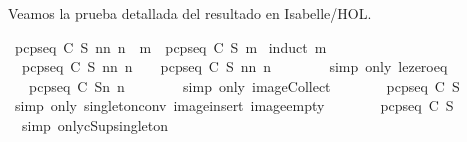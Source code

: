 \begin{isabellebody}
\begin{isamarkuptext}
  Veamos la prueba detallada del resultado en Isabelle/HOL.%
\end{isamarkuptext}\isamarkuptrue%
\isamarkupfalse%
\ {\isachardoublequoteopen}{\isasymUnion}{\isacharbraceleft}pcp{\isacharunderscore}seq\ C\ S\ n{\isacharbar}n{\isachardot}\ n\ {\isasymle}\ m{\isacharbraceright}\ {\isacharequal}\ pcp{\isacharunderscore}seq\ C\ S\ m{\isachardoublequoteclose}\isanewline
%
\isadelimproof
%
\endisadelimproof
%
\isatagproof
{}\isamarkupfalse%
\ {\isacharparenleft}induct\ m{\isacharparenright}\isanewline
\ \ \isamarkupfalse%
\ \ {\isachardoublequoteopen}{\isasymUnion}{\isacharbraceleft}pcp{\isacharunderscore}seq\ C\ S\ n{\isacharbar}n{\isachardot}\ n\ {\isasymle}\ {}{\isacharbraceright}\ {\isacharequal}\ {\isasymUnion}{\isacharbraceleft}pcp{\isacharunderscore}seq\ C\ S\ n{\isacharbar}n{\isachardot}\ n\ {\isacharequal}\ {}{\isacharbraceright}{\isachardoublequoteclose}\isanewline
\ \ \ \ \isamarkupfalse%
\ {\isacharparenleft}simp\ only{\isacharcolon}\ le{\isacharunderscore}zero{\isacharunderscore}eq{\isacharparenright}\isanewline
\ \ \isamarkupfalse%
\ \isamarkupfalse%
\ {\isachardoublequoteopen}{\isasymdots}\ {\isacharequal}\ {\isasymUnion}{\isacharparenleft}{\isacharparenleft}pcp{\isacharunderscore}seq\ C\ S{\isacharparenright}{\isacharbackquote}{\isacharbraceleft}n{\isachardot}\ n\ {\isacharequal}\ {}{\isacharbraceright}{\isacharparenright}{\isachardoublequoteclose}\isanewline
\ \ \ \ \isamarkupfalse%
\ {\isacharparenleft}simp\ only{\isacharcolon}\ image{\isacharunderscore}Collect{\isacharparenright}\isanewline
\ \ \isamarkupfalse%
\ \isamarkupfalse%
\ {\isachardoublequoteopen}{\isasymdots}\ {\isacharequal}\ {\isasymUnion}{\isacharbraceleft}pcp{\isacharunderscore}seq\ C\ S\ {}{\isacharbraceright}{\isachardoublequoteclose}\isanewline
\ \ \ \ \isamarkupfalse%
\ {\isacharparenleft}simp\ only{\isacharcolon}\ singleton{\isacharunderscore}conv\ image{\isacharunderscore}insert\ image{\isacharunderscore}empty{\isacharparenright}\isanewline
\ \ \isamarkupfalse%
\ \isamarkupfalse%
\ {\isachardoublequoteopen}{\isasymdots}\ {\isacharequal}\ pcp{\isacharunderscore}seq\ C\ S\ {}{\isachardoublequoteclose}\ \isanewline
\ \ \ \ \isamarkupfalse%
\ \ {\isacharparenleft}simp\ only{\isacharcolon}cSup{\isacharunderscore}singleton{\isacharparenright}\isanewline
\ \ \isamarkupfalse%

\end{isabellebody}
